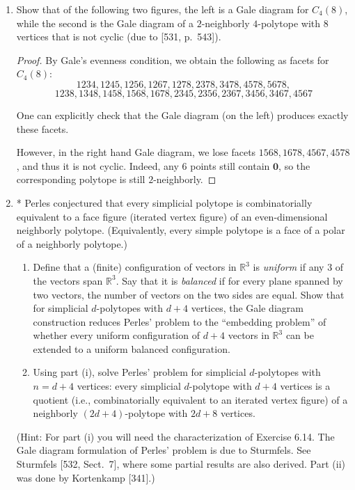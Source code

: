 \documentclass{article}
\begin{document}
\begin{enumerate}
\begin{proof}
\smallskip
The corresponding criteria for even-dimensional neighborly Gale diagrams is just that either $\textbf{0} \notin \relint(\conv(S))$ for every set $S$ of $d$ vertices, or that every minimal dependence splits into exactly $d+1$ points on each side. 
\end{proof}

\item Show that of the following two figures, the left is a Gale diagram for $C_4(8)$, while the second is the Gale diagram of a $2$-neighborly $4$-polytope with $8$ vertices that is not cyclic (due to [531, p.\ 543]).

\begin{proof}
By Gale's evenness condition, we obtain the following as facets for $C_4(8)$:
\[1234, 1245, 1256, 1267, 1278, 2378, 3478, 4578, 5678,\]
\[1238, 1348, 1458, 1568, 1678, 2345, 2356, 2367, 3456, 3467, 4567\]

One can explicitly check that the Gale diagram (on the left) produces exactly these facets.

However, in the right hand Gale diagram, we lose facets $1568, 1678, 4567, 4578$, and thus it is not cyclic. Indeed, any $6$ points still contain $\textbf{0}$, so the corresponding polytope is still $2$-neighborly.
\end{proof}

\item* Perles conjectured that every simplicial polytope is combinatorially equivalent to a face figure (iterated vertex figure) of an even-dimensional neighborly polytope. (Equivalently, every simple polytope is a face of a polar of a neighborly polytope.)
\begin{enumerate}[label=(\roman*)]
\item Define that a (finite) configuration of vectors in $\mathbb{R}^3$ is \emph{uniform} if any $3$ of the vectors span $\mathbb{R}^3$. Say that it is \emph{balanced} if for every plane spanned by two vectors, the number of vectors on the two sides are equal. Show that for simplicial $d$-polytopes with $d+4$ vertices, the Gale diagram construction reduces Perles' problem to the ``embedding problem'' of whether every uniform configuration of $d+4$ vectors in $\mathbb{R}^3$ can be extended to a uniform balanced configuration.
\item Using part (i), solve Perles' problem for simplicial $d$-polytopes with $n=d+4$ vertices: every simplicial $d$-polytope with $d+4$ vertices is a quotient (i.e., combinatorially equivalent to an iterated vertex figure) of a neighborly $(2d+4)$-polytope with $2d+8$ vertices.
\end{enumerate}
(Hint: For part (i) you will need the characterization of Exercise 6.14. The Gale diagram formulation of Perles' problem is due to Sturmfels. See Sturmfels [532, Sect.\ 7], where some partial results are also derived. Part (ii) was done by Kortenkamp [341].)


\end{enumerate}
\end{document}

